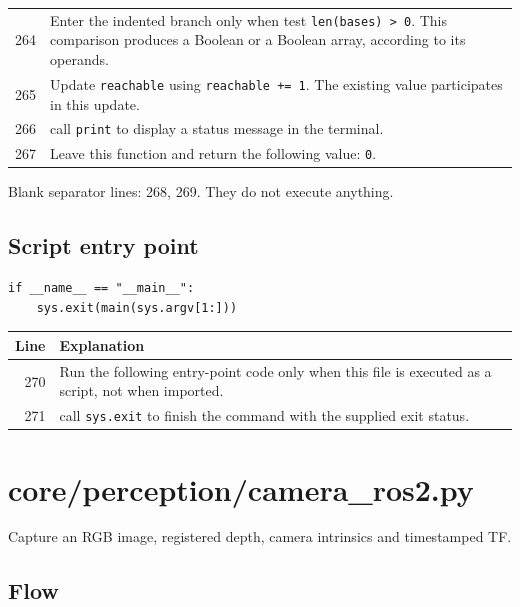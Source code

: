 \documentclass[11pt,a4paper]{book}
\begin{document}
\begin{longtable}{r p{}}
264 & Enter the indented branch only when test \texttt{len(bases) > 0}. This comparison produces a Boolean or a Boolean array, according to its operands. \\

265 & Update \texttt{reachable} using \texttt{reachable += 1}. The existing value participates in this update. \\

266 & call \texttt{print} to display a status message in the terminal. \\

267 & Leave this function and return the following value: \texttt{0}. \\

\end{longtable}

Blank separator lines: 268, 269. They do not execute anything.

\section{Script entry point}

\begin{lstlisting}[firstnumber=270]
if __name__ == "__main__":
    sys.exit(main(sys.argv[1:]))
\end{lstlisting}

\begin{longtable}{r p{}}

\textbf{Line} & \textbf{Explanation} \\ \hline \endhead

270 & Run the following entry-point code only when this file is executed as a script, not when imported. \\

271 & call \texttt{sys.exit} to finish the command with the supplied exit status. \\

\end{longtable}

\chapter{core/perception/camera\_ros2.py}

Capture an RGB image, registered depth, camera intrinsics and timestamped TF.

\section*{Flow}
\end{document}
